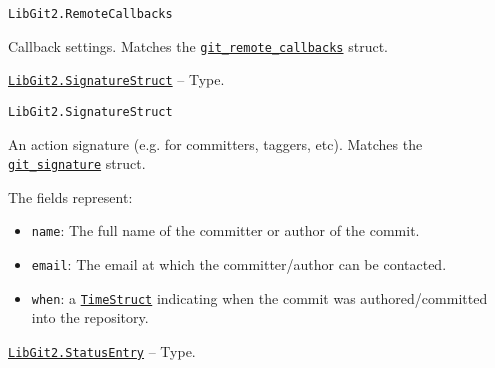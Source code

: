 \begin{adjustwidth}{2em}{0pt}


\begin{verbatim}
LibGit2.RemoteCallbacks
\end{verbatim}

Callback settings. Matches the \href{https://libgit2.org/libgit2/\#HEAD/type/git\_remote\_callbacks}{\texttt{git\_remote\_callbacks}} struct.



\end{adjustwidth}
\hypertarget{8598007626850742967}{} 
\hyperlink{8598007626850742967}{\texttt{LibGit2.SignatureStruct}}  -- {Type.}

\begin{adjustwidth}{2em}{0pt}


\begin{verbatim}
LibGit2.SignatureStruct
\end{verbatim}

An action signature (e.g. for committers, taggers, etc). Matches the \href{https://libgit2.org/libgit2/\#HEAD/type/git\_signature}{\texttt{git\_signature}} struct.

The fields represent:

\begin{itemize}
\item \texttt{name}: The full name of the committer or author of the commit.


\item \texttt{email}: The email at which the committer/author can be contacted.


\item \texttt{when}: a \hyperlink{11932909532186040994}{\texttt{TimeStruct}} indicating when the commit was  authored/committed into the repository.

\end{itemize}


\end{adjustwidth}
\hypertarget{16035791715224568905}{} 
\hyperlink{16035791715224568905}{\texttt{LibGit2.StatusEntry}}  -- {Type.}

